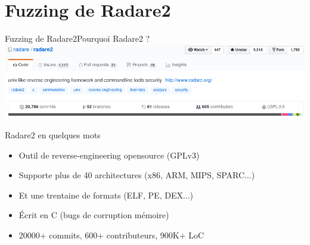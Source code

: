 \section{Fuzzing de Radare2}

\begin{frame}{Fuzzing de Radare2}{Pourquoi Radare2 ?}
  \includegraphics[width=\linewidth]{../medias/radare2-github.png}
  \begin{exampleblock}{Radare2 en quelques mots}
    \begin{itemize}
    \item{Outil de reverse-engineering opensource (GPLv3)}
    \item{Supporte plus de 40 architectures (x86, ARM, MIPS, SPARC...)}
    \item{Et une trentaine de formats (ELF, PE, DEX...)}
    \item{Écrit en C (bugs de corruption mémoire)}
    \item{20000+ commits, 600+ contributeurs, 900K+ LoC}
    \end{itemize}
  \end{exampleblock}
\end{frame}

